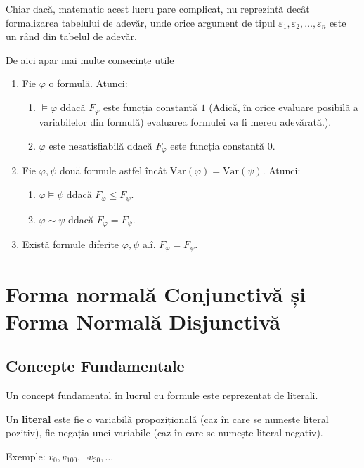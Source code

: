 Chiar dacă, matematic acest lucru pare complicat, nu reprezintă decât formalizarea tabelului de adevăr, unde orice argument de tipul
\( \varepsilon_1, \varepsilon_2, \dots, \varepsilon_n \) este un rând din tabelul de adevăr.

De aici apar mai multe consecințe utile

\begin{prop}
	\noindent \begin{enumerate}
		\item[(i)] Fie $\varphi$ o formulă. Atunci:
			\begin{enumerate}
				\item[(a)] $\models \varphi$ ddacă $F_{\varphi}$ este funcția constantă $1$ (Adică, în orice evaluare posibilă a variabilelor din formulă)
					evaluarea formulei va fi mereu adevărată.).
				\item[(b)] $\varphi$ este nesatisfiabilă ddacă $F_{\varphi}$ este funcția constantă $0$.
			\end{enumerate}

		\item[(ii)] Fie $\varphi, \psi$ două formule astfel încât $\text{Var}(\varphi) = \text{Var}(\psi)$. Atunci:
			\begin{enumerate}
				\item[(a)] $\varphi \models \psi$ ddacă $F_{\varphi} \leq F_{\psi}$.
				\item[(b)] $\varphi \sim \psi$ ddacă $F_{\varphi} = F_{\psi}$.
			\end{enumerate}

		\item[(iii)] Există formule diferite $\varphi, \psi$ a.î. $F_{\varphi} = F_{\psi}$.
	\end{enumerate}
\end{prop}

\section{Forma normală Conjunctivă și Forma Normală Disjunctivă}

\subsection{Concepte Fundamentale}

Un concept fundamental în lucrul cu formule este reprezentat de literali.

\begin{definition}
	Un \textbf{literal} este fie o variabilă propozițională (caz în care se numește literal pozitiv), fie negația unei variabile (caz în care se
	numește literal negativ).

	\noindent Exemple: \( v_0, v_{100}, \neg v_{30}, \dots \)
\end{definition}

